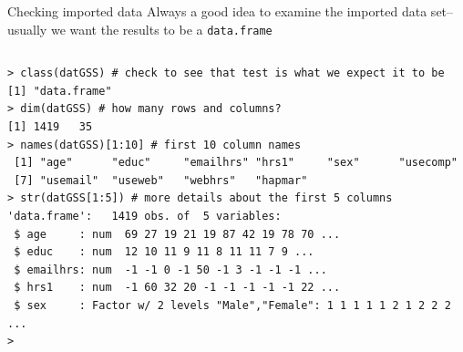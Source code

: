 \documentclass[table,smaller]{beamer}
\begin{document}
\begin{frame}[fragile,label=sec-4-4]{Checking imported data}
 Always a good idea  to examine the imported data set--usually we want the results to be a \verb~data.frame~
\vspace{-.5em}
\begin{columns}
\begin{block}{}
\begin{verbatim}
> class(datGSS) # check to see that test is what we expect it to be
[1] "data.frame"
> dim(datGSS) # how many rows and columns?
[1] 1419   35
> names(datGSS)[1:10] # first 10 column names
 [1] "age"      "educ"     "emailhrs" "hrs1"     "sex"      "usecomp" 
 [7] "usemail"  "useweb"   "webhrs"   "hapmar"  
> str(datGSS[1:5]) # more details about the first 5 columns
'data.frame':	1419 obs. of  5 variables:
 $ age     : num  69 27 19 21 19 87 42 19 78 70 ...
 $ educ    : num  12 10 11 9 11 8 11 11 7 9 ...
 $ emailhrs: num  -1 -1 0 -1 50 -1 3 -1 -1 -1 ...
 $ hrs1    : num  -1 60 32 20 -1 -1 -1 -1 -1 22 ...
 $ sex     : Factor w/ 2 levels "Male","Female": 1 1 1 1 1 2 1 2 2 2 ...
>
\end{verbatim}
\end{block}
\end{columns}
\vspace{.5em}
\end{frame}
\end{document}
